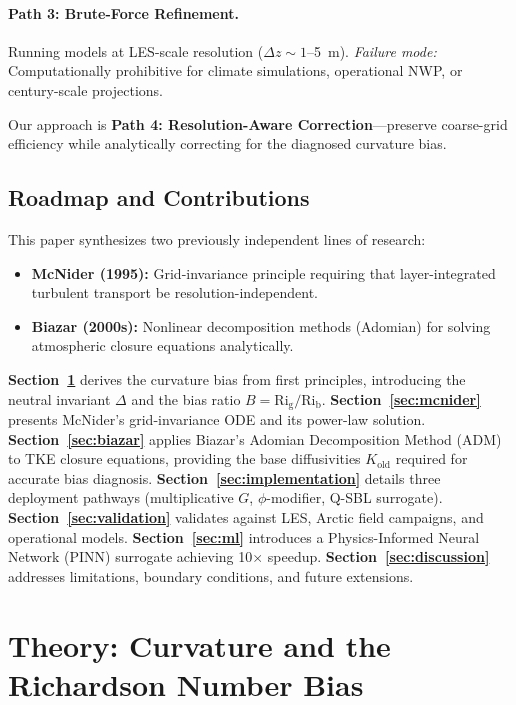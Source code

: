 \documentclass[twocolumn,11pt]{article}
\newcommand{\Rig}{\text{Ri}_{\text{g}}}
\newcommand{\Rib}{\text{Ri}_{\text{b}}}
\begin{document}
\paragraph{Path 3: Brute-Force Refinement.} Running models at LES-scale resolution ($\Delta z \sim 1$--5~m). \textit{Failure mode:} Computationally prohibitive for climate simulations, operational NWP, or century-scale projections.

\noindent Our approach is \textbf{Path 4: Resolution-Aware Correction}—preserve coarse-grid efficiency while analytically correcting for the diagnosed curvature bias.

\subsection{Roadmap and Contributions}

This paper synthesizes two previously independent lines of research:

\begin{itemize}
\item \textbf{McNider (1995):} Grid-invariance principle requiring that layer-integrated turbulent transport be resolution-independent.
\item \textbf{Biazar (2000s):} Nonlinear decomposition methods (Adomian) for solving atmospheric closure equations analytically.
\end{itemize}

\noindent \textbf{Section~\ref{sec:theory}} derives the curvature bias from first principles, introducing the neutral invariant $\Delta$ and the bias ratio $B = \Rig/\Rib$. \textbf{Section~\ref{sec:mcnider}} presents McNider's grid-invariance ODE and its power-law solution. \textbf{Section~\ref{sec:biazar}} applies Biazar's Adomian Decomposition Method (ADM) to TKE closure equations, providing the base diffusivities $K_{\text{old}}$ required for accurate bias diagnosis. \textbf{Section~\ref{sec:implementation}} details three deployment pathways (multiplicative $G$, $\phi$-modifier, Q-SBL surrogate). \textbf{Section~\ref{sec:validation}} validates against LES, Arctic field campaigns, and operational models. \textbf{Section~\ref{sec:ml}} introduces a Physics-Informed Neural Network (PINN) surrogate achieving 10$\times$ speedup. \textbf{Section~\ref{sec:discussion}} addresses limitations, boundary conditions, and future extensions.

\section{Theory: Curvature and the Richardson Number Bias}
\label{sec:theory}
\end{document}
